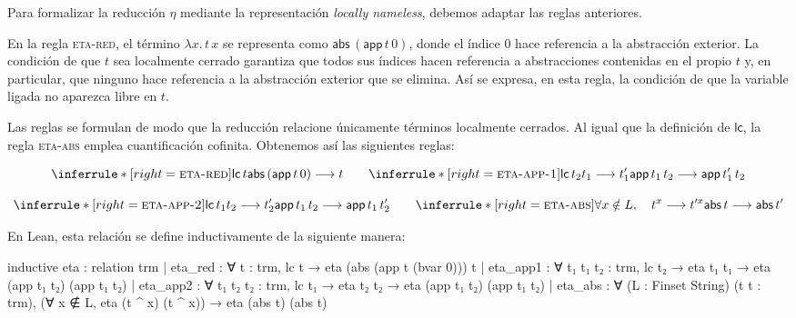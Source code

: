 \documentclass[
  spanish,
  letterpaper,
  DIV=11,
  numbers=noendperiod]{scrreprt}
\newenvironment{Shaded}{\begin{snugshade}}{\end{snugshade}}
\newcommand{\NormalTok}[1]{\textcolor[rgb]{0.00,0.23,0.31}{#1}}
\renewcommand{\NormalTok}[1]{\textcolor[HTML]{000000}{#1}}
\theoremstyle{remark}
\begin{document}
Para formalizar la reducción \(\eta\) mediante la representación
\emph{locally nameless}, debemos adaptar las reglas anteriores.

En la regla \textsc{eta-red}, el término \(\lambda x.\,t\,x\) se
representa como \(\mathsf{abs}\,(\mathsf{app}\,t\,0)\), donde el índice
\(0\) hace referencia a la abstracción exterior. La condición de que
\(t\) sea localmente cerrado garantiza que todos sus índices hacen
referencia a abstracciones contenidas en el propio \(t\) y, en
particular, que ninguno hace referencia a la abstracción exterior que se
elimina. Así se expresa, en esta regla, la condición de que la variable
ligada no aparezca libre en \(t\).

Las reglas se formulan de modo que la reducción relacione únicamente
términos localmente cerrados. Al igual que la definición de
\(\mathsf{lc}\), la regla \textsc{eta-abs} emplea cuantificación
cofinita. Obtenemos así las siguientes reglas:

\[
\inferrule*[right=\textsc{eta-red}]
  {\mathsf{lc} \, t}
  {\mathsf{abs} \, (\mathsf{app} \, t \, 0)
   \longrightarrow t}
\qquad
\inferrule*[right=\textsc{eta-app-1}]
  {\mathsf{lc} \, t_2 \\ 
    t_1 \longrightarrow t_1'}
  {\mathsf{app}\,t_1\,t_2
   \longrightarrow
   \mathsf{app}\,t_1'\,t_2}
\]

\[
\inferrule*[right=\textsc{eta-app-2}]
  {\mathsf{lc} \, t_1 \\
   t_2 \longrightarrow t_2'}
  {\mathsf{app}\,t_1\,t_2
   \longrightarrow
   \mathsf{app} \, t_1 \, t_2'}
\qquad
\inferrule*[right=\textsc{eta-abs}]
  {\forall x\notin L, \quad
   t^x \longrightarrow t'^x}
  {\mathsf{abs}\,t
   \longrightarrow
   \mathsf{abs}\,t'}
\]

En Lean, esta relación se define inductivamente de la siguiente manera:

\begin{Shaded}
\begin{Highlighting}[]
\NormalTok{inductive eta : relation trm}
\NormalTok{  | eta\_red : ∀ t : trm,}
\NormalTok{      lc t →}
\NormalTok{      eta (abs (app t (bvar 0))) t}
\NormalTok{  | eta\_app1 : ∀ t₁ t₁\textquotesingle{} t₂ : trm,}
\NormalTok{      lc t₂ →}
\NormalTok{      eta t₁ t₁\textquotesingle{} →}
\NormalTok{      eta (app t₁ t₂) (app t₁\textquotesingle{} t₂)}
\NormalTok{  | eta\_app2 : ∀ t₁ t₂ t₂\textquotesingle{} : trm,}
\NormalTok{      lc t₁ →}
\NormalTok{      eta t₂ t₂\textquotesingle{} →}
\NormalTok{      eta (app t₁ t₂) (app t₁ t₂\textquotesingle{})}
\NormalTok{  | eta\_abs : ∀ (L : Finset String) (t t\textquotesingle{} : trm),}
\NormalTok{      (∀ x ∉ L, eta (t \^{} x) (t\textquotesingle{} \^{} x)) →}
\NormalTok{      eta (abs t) (abs t\textquotesingle{})}
\end{Highlighting}
\end{Shaded}
\end{document}

